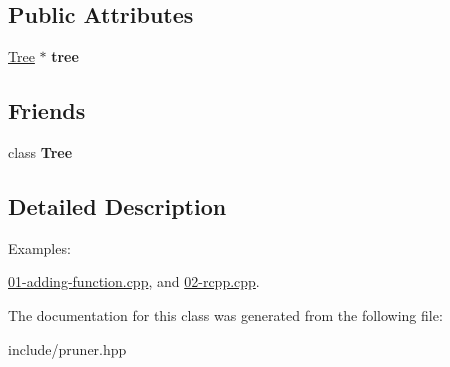 \subsection*{Public Attributes}
\begin{DoxyCompactItemize}
\item 
\hyperlink{classpruner_1_1Tree}{Tree} $\ast$ {\bfseries tree}\hypertarget{classpruner_1_1TreeIterator_a4004afb2d477525015da737572007c88}{}\label{classpruner_1_1TreeIterator_a4004afb2d477525015da737572007c88}

\end{DoxyCompactItemize}
\subsection*{Friends}
\begin{DoxyCompactItemize}
\item 
class {\bfseries Tree}\hypertarget{classpruner_1_1TreeIterator_a4b682814d14447120dd184fd300deade}{}\label{classpruner_1_1TreeIterator_a4b682814d14447120dd184fd300deade}

\end{DoxyCompactItemize}


\subsection{Detailed Description}
\begin{Desc}
\item[Examples\+: ]\par
\hyperlink{01-adding-function_8cpp-example}{01-\/adding-\/function.\+cpp}, and \hyperlink{02-rcpp_8cpp-example}{02-\/rcpp.\+cpp}.\end{Desc}


The documentation for this class was generated from the following file\+:\begin{DoxyCompactItemize}
\item 
include/pruner.\+hpp\end{DoxyCompactItemize}
